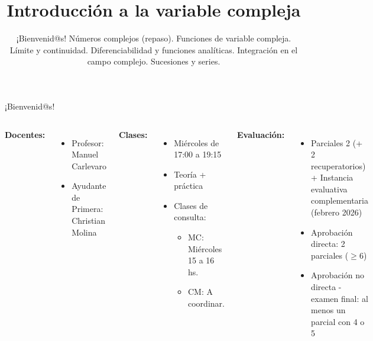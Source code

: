 \documentclass[9pt, aspectratio=169]{beamer}
\title{Introducción a la variable compleja}
\subtitle{¡Bienvenid@s! Números complejos (repaso). Funciones de variable compleja. Límite y continuidad. Diferenciabilidad y funciones analíticas. Integración en el campo complejo. Sucesiones y series.}
\begin{document}
\maketitle

\begin{frame}{ ¡Bienvenid@s! }
	\begin{columns}[c]
		\cx
		\textbf{Docentes:}
		\begin{itemize}
			\item Profesor: Manuel Carlevaro
			\item Ayudante de Primera: Christian Molina
		\end{itemize}
		\vspace{1em}

		\textbf{Clases:}
		\begin{itemize}
			\item Miércoles de 17:00 a 19:15
			\item Teoría + práctica
			\item Clases de consulta:
			      \begin{itemize}
				      \item MC: Miércoles 15 a 16 hs.
				      \item CM: A coordinar.
			      \end{itemize}
		\end{itemize}
		\cx
		\textbf{Evaluación:}
		\begin{itemize}
			\item Parciales 2 (+ 2 recuperatorios) + Instancia evaluativa complementaria (febrero 2026)
			\item Aprobación directa: 2 parciales ($\geq 6$)
			\item Aprobación no directa - examen final: al menos un parcial con 4 o 5
		\end{itemize}
	\end{columns}
\end{frame}
\end{document}
